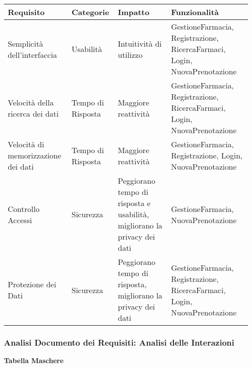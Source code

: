 \begin{tabular} {|P{4cm}|P{2.5cm}|P{3.5cm}|P{6cm}|}
    \hline
    \textbf{Requisito}                  & \textbf{Categorie} & \textbf{Impatto}                                                         & \textbf{Funzionalità}                                                     \\
    \hline
    Semplicità dell'interfaccia         & Usabilità          & Intuitività di utilizzo                                                  & GestioneFarmacia, Registrazione, RicercaFarmaci, Login, NuovaPrenotazione \\
    \hline
    Velocità della ricerca dei dati     & Tempo di Risposta  & Maggiore reattività                                                      & GestioneFarmacia, Registrazione, RicercaFarmaci, Login, NuovaPrenotazione \\
    \hline
    Velocità di memorizzazione dei dati & Tempo di Risposta  & Maggiore reattività                                                      & GestioneFarmacia, Registrazione, Login, NuovaPrenotazione                 \\
    \hline
    Controllo Accessi                   & Sicurezza          & Peggiorano tempo di risposta e usabilità, migliorano la privacy dei dati & GestioneFarmacia, NuovaPrenotazione                                       \\
    \hline
    Protezione dei Dati                 & Sicurezza          & Peggiorano tempo di risposta, migliorano la privacy dei dati             & GestioneFarmacia, Registrazione, RicercaFarmaci, Login, NuovaPrenotazione \\
    \hline
\end{tabular}

\newpage

\subsubsection{Analisi Documento dei Requisiti: Analisi delle Interazioni}
\hfill \break

\textbf{Tabella Maschere}
\hfill \break

